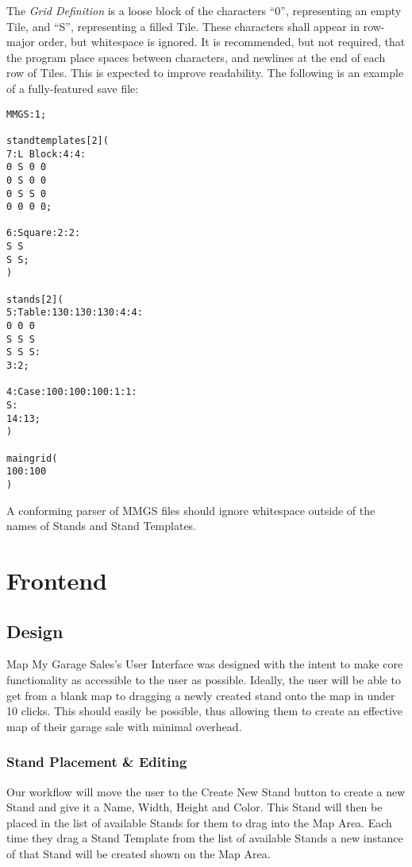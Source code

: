\documentclass{report}
\begin{document}
The \emph{Grid Definition} is a loose block of the characters ``0'',
representing an empty Tile, and ``S'', representing a filled Tile.
These characters shall appear in row-major order, but whitespace is ignored.
It is recommended, but not required, that the program place spaces between
characters, and newlines at the end of each row of Tiles. This is expected to
improve readability.
\newpage
The following is an example of a fully-featured save file:
\begin{verbatim}
MMGS:1;

standtemplates[2](
7:L Block:4:4:
0 S 0 0
0 S 0 0
0 S S 0
0 0 0 0;

6:Square:2:2:
S S
S S;
)

stands[2](
5:Table:130:130:130:4:4:
0 0 0
S S S
S S S:
3:2;

4:Case:100:100:100:1:1:
S:
14:13;
)

maingrid(
100:100
)
\end{verbatim}

A conforming parser of MMGS files should ignore whitespace outside of the
names of Stands and Stand Templates.

\chapter{Frontend}

\section{Design}
Map My Garage Sales's User Interface was designed with the intent to make core
 functionality as accessible to the user as possible.  Ideally, the user will be able to 
get from a blank map to dragging a newly created stand onto the map in under 10 
clicks.  This should easily be possible, thus allowing them to create an effective map 
of their garage sale with minimal overhead.  

\subsection{Stand Placement \& Editing}
Our workflow will move the user to the Create New Stand button to create a new 
Stand and give it a Name, Width, Height and Color.  This Stand will then be placed
 in the list of available Stands for them to drag into the Map Area.  Each time they 
drag a Stand Template from the list of available Stands a new instance of that Stand 
will be created shown on the Map Area.
\end{document}
